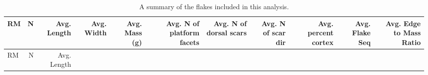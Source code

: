 \documentclass[]{elsarticle} %
\begin{document}
\begin{longtable}[]{@{}lrrrrrrrrrr@{}}
\caption{A summary of the flakes included in this analysis.
\label{table3}}\tabularnewline
\toprule
\begin{minipage}[b]{0.02\columnwidth}\raggedright
RM\strut
\end{minipage} & \begin{minipage}[b]{0.02\columnwidth}\raggedleft
N\strut
\end{minipage} & \begin{minipage}[b]{0.05\columnwidth}\raggedleft
Avg. Length\strut
\end{minipage} & \begin{minipage}[b]{0.05\columnwidth}\raggedleft
Avg. Width\strut
\end{minipage} & \begin{minipage}[b]{0.06\columnwidth}\raggedleft
Avg. Mass (g)\strut
\end{minipage} & \begin{minipage}[b]{0.11\columnwidth}\raggedleft
Avg. N of platform facets\strut
\end{minipage} & \begin{minipage}[b]{0.10\columnwidth}\raggedleft
Avg. N of dorsal scars\strut
\end{minipage} & \begin{minipage}[b]{0.08\columnwidth}\raggedleft
Avg. N of scar dir\strut
\end{minipage} & \begin{minipage}[b]{0.08\columnwidth}\raggedleft
Avg. percent cortex\strut
\end{minipage} & \begin{minipage}[b]{0.06\columnwidth}\raggedleft
Avg. Flake Seq\strut
\end{minipage} & \begin{minipage}[b]{0.10\columnwidth}\raggedleft
Avg. Edge to Mass Ratio\strut
\end{minipage}\tabularnewline
\midrule
\endfirsthead
\toprule
\begin{minipage}[b]{0.02\columnwidth}\raggedright
RM\strut
\end{minipage} & \begin{minipage}[b]{0.02\columnwidth}\raggedleft
N\strut
\end{minipage} & \begin{minipage}[b]{0.05\columnwidth}\raggedleft
Avg. Length\strut
\end{minipage} & \begin{minipage}[b]{0.05\columnwidth}\raggedleft

\end{minipage}
\end{longtable}
\end{document}
